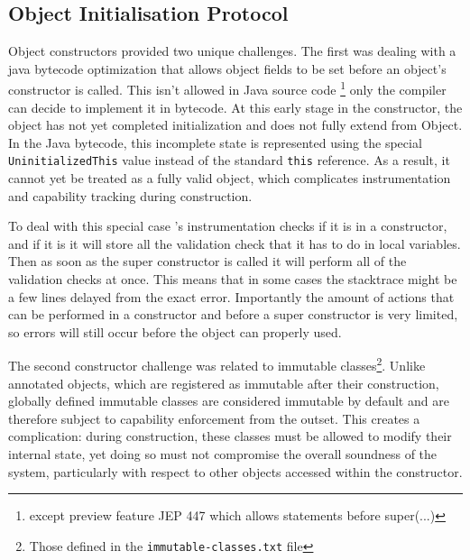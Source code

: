 


\subsection{Object Initialisation Protocol}

Object constructors provided two unique challenges. The first was dealing with a java bytecode optimization that allows object fields to be set before an object's constructor is called. This isn't allowed in Java source code \footnote{except preview feature JEP 447 which allows statements before super(...)} only the compiler can decide to implement it in bytecode. At this early stage in the constructor, the object has not yet completed initialization and does not fully extend from Object. In the Java bytecode, this incomplete state is represented using the special \texttt{UninitializedThis} value instead of the standard \texttt{this} reference. As a result, it cannot yet be treated as a fully valid object, which complicates instrumentation and capability tracking during construction.

To deal with this special case \jdala 's instrumentation checks if it is in a constructor, and if it is it will store all the validation check that it has to do in local variables. Then as soon as the super constructor is called it will perform all of the validation checks at once. This means that in some cases the stacktrace might be a few lines delayed from the exact error. Importantly the amount of actions that can be performed in a constructor and before a super constructor is very limited, so errors will still occur before the object can properly used.

The second constructor challenge was related to immutable classes\footnote{Those defined in the \texttt{immutable-classes.txt} file}. Unlike annotated objects, which are registered as immutable after their construction, globally defined immutable classes are considered immutable by default and are therefore subject to capability enforcement from the outset. This creates a complication: during construction, these classes must be allowed to modify their internal state, yet doing so must not compromise the overall soundness of the system, particularly with respect to other objects accessed within the constructor.

